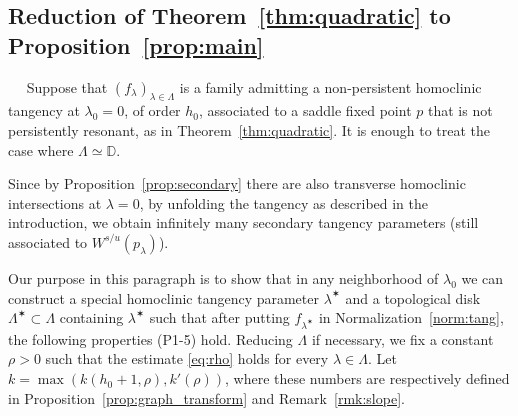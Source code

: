\documentclass[11pt, oneside]{amsart}
\newcommand{\B}{\mathbb{B}}
\newcommand{\D}{\mathbb{D}}
\newcommand{\fr}{\partial}
\newcommand{\set}[1]{\left\{#1\right\}}
\newcommand{\la}{\lambda}
\newcommand{\loc}{{\mathrm{loc}}}
\newcommand{\inv}{^{-1}}
\theoremstyle{remark}
\theoremstyle{definition}
\theoremstyle{theorem}
\newcommand{\commentaire}[1]{}
\begin{document}

   
\subsection{Reduction of Theorem~\ref{thm:quadratic} to  Proposition~\ref{prop:main}} \label{subs:reduction} ~ \commentaire{Subsection rewritten completely and many details added for Exposition Remark \#2}
Suppose that $(f_\lambda)_{\lambda\in \Lambda}$ is a family
admitting a non-persistent homoclinic tangency at $\lambda_0=0$, of order $h_0$,
associated to a saddle fixed point $p$ 
that is not persistently resonant, as in Theorem~\ref{thm:quadratic}. It is enough to treat the case where 
$\Lambda\simeq \D$. 

 
Since by Proposition~\ref{prop:secondary} 
there are also  transverse homoclinic intersections at $\lambda=0$, 
 by unfolding the tangency  as described in the introduction,
we obtain infinitely  many secondary tangency parameters  
(still associated to  $W^{s/u}(p_\lambda)$). 

Our purpose in this paragraph is to show that in any neighborhood of $\lambda_0$ 
we can construct a    special
  homoclinic  tangency parameter $\lambda^\varstar$ 
and a topological disk $\Lambda^\varstar\subset \Lambda$ containing $\lambda^\varstar$ 
such that after putting $f_{\lambda^\varstar}$ in Normalization~\ref{norm:tang}, 
the following properties (P1-5) hold. 
Reducing $\Lambda$ if necessary, 
we fix  a constant $\rho>0$   such that the estimate \eqref{eq:rho} holds for every 
$\lambda\in \Lambda$.  Let $k =\max (k(h_0+1, \rho), k'(\rho))$, 
where these numbers are respectively defined in 
 Proposition~\ref{prop:graph_transform} and Remark~\ref{rmk:slope}.
\end{document}
